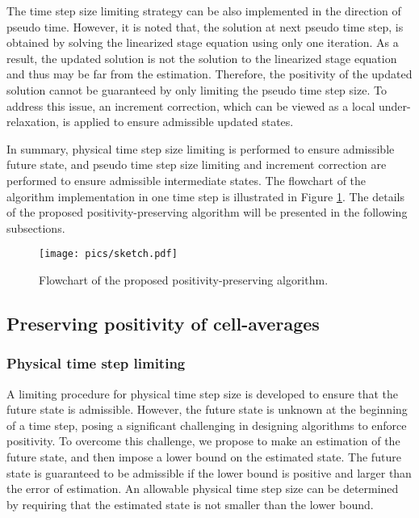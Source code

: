 The time step size limiting strategy can be also implemented in the direction of pseudo time. However, it is noted that, the solution at next pseudo time step, is obtained by solving the linearized stage equation using only one iteration. As a result, the updated solution is not the solution to the linearized stage equation and thus may be far from the estimation. Therefore, the positivity of the updated solution cannot be guaranteed by only limiting the pseudo time step size. To address this issue, an increment correction, which can be viewed as a local under-relaxation, is applied to ensure admissible updated states. 


In summary, physical time step size limiting is performed to ensure admissible future state, and pseudo time step size limiting and increment correction are performed to ensure admissible intermediate states. The flowchart of the algorithm implementation in one time step is illustrated in Figure \ref{fig:sketch}. The details of the proposed positivity-preserving algorithm will be presented in the following subsections.

\begin{figure}[htbp!]
    \centering
    \texttt{[image: pics/sketch.pdf]}
    \caption{Flowchart of the proposed positivity-preserving algorithm.}
    \label{fig:sketch}
\end{figure}

\subsection{Preserving positivity of cell-averages}
\subsubsection{Physical time step limiting}
\label{ssec:physical-limiting}
A limiting procedure for physical time step size is developed to ensure that the future state is admissible. However, the future state is unknown at the beginning of a time step, posing a significant challenging in designing algorithms to enforce positivity. To overcome this challenge, we propose to make an estimation of the future state, and then impose a lower bound on the estimated state. The future state is guaranteed to be admissible if the lower bound is positive and larger than the error of estimation. An allowable physical time step size can be determined by requiring that the estimated state is not smaller than the lower bound. 


